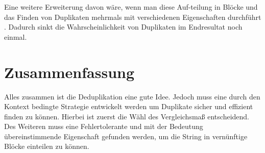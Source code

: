 \documentclass[sigconf]{acmart}
\begin{document}
Eine weitere Erweiterung davon wäre, wenn man diese
Auf-teilung in Blöcke und das Finden von Duplikaten
mehrmals mit verschiedenen Eigenschaften durchführt
\cite[Vlg. S. 11]{elmagarmid1}.
Dadurch sinkt die Wahrscheinlichkeit von Duplikaten
im Endresultat noch einmal.

\section*{Zusammenfassung}
Alles zusammen ist die Deduplikation eine gute Idee.
Jedoch muss eine durch den Kontext bedingte Strategie entwickelt
werden um Duplikate sicher und effizient finden zu
können. Hierbei ist zuerst die Wähl des Vergleichsmaß
entscheidend. Des Weiteren muss eine Fehlertolerante
und mit der Bedeutung übereinstimmende Eigenschaft
gefunden werden, um die String in vernünftige Blöcke
einteilen zu können.



\end{document}
